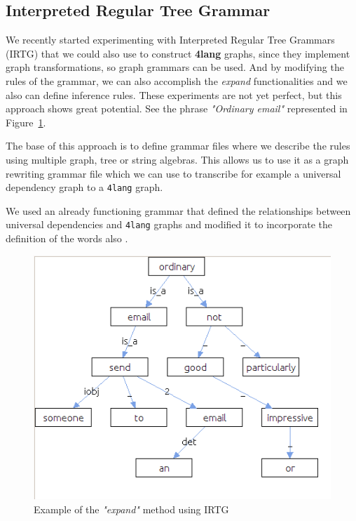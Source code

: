 \subsection{Interpreted Regular Tree Grammar}
We recently started experimenting with Interpreted Regular Tree Grammars \cite{Koller:2011} (IRTG) that we could also use to construct \textbf{4lang} graphs, since they implement graph transformations, so graph grammars can be used. And by modifying the rules of the grammar, we can also accomplish the \textit{expand} functionalities and we also can define inference rules. These experiments are not yet perfect, but this approach shows great potential. See the phrase \textit{"Ordinary email"} represented in Figure~\ref{fig:irtg}.

The base of this approach is to define grammar files where we describe the rules using multiple graph, tree or string algebras. This allows us to use it as a graph rewriting grammar file which we can use to transcribe for example a universal dependency graph to a \texttt{4lang} graph.

We used an already functioning grammar that defined the relationships between universal dependencies and \texttt{4lang} graphs and modified it to incorporate the definition of the words also \cite{AcsEvelin:2018}.

\begin{figure}[h]
	\centering
	\includegraphics[scale=0.4]{figures/irtg.jpg}
	\caption{Example of the \textit{"expand"} method using IRTG}
	\label{fig:irtg}
\end{figure}